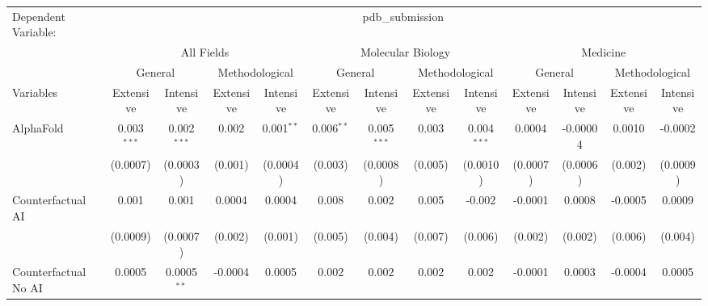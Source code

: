 \begingroup
\centering
\begin{tabular}{lcccccccccccc}
   \tabularnewline \midrule \midrule
   Dependent Variable: & \multicolumn{12}{c}{pdb\_submission}\\
 & \multicolumn{4}{c}{All Fields} & \multicolumn{4}{c}{Molecular Biology} & \multicolumn{4}{c}{Medicine} \\
\cmidrule(lr){2-5} \cmidrule(lr){6-9} \cmidrule(lr){10-13}
 & \multicolumn{2}{c}{General} & \multicolumn{2}{c}{Methodological} & \multicolumn{2}{c}{General} & \multicolumn{2}{c}{Methodological} & \multicolumn{2}{c}{General} & \multicolumn{2}{c}{Methodological} \\
\cmidrule(lr){2-3} \cmidrule(lr){4-5} \cmidrule(lr){6-7} \cmidrule(lr){8-9} \cmidrule(lr){10-11} \cmidrule(lr){12-13}
Variables & \multicolumn{1}{c}{Extensive} & \multicolumn{1}{c}{Intensive} & \multicolumn{1}{c}{Extensive} & \multicolumn{1}{c}{Intensive} & \multicolumn{1}{c}{Extensive} & \multicolumn{1}{c}{Intensive} & \multicolumn{1}{c}{Extensive} & \multicolumn{1}{c}{Intensive} & \multicolumn{1}{c}{Extensive} & \multicolumn{1}{c}{Intensive} & \multicolumn{1}{c}{Extensive} & \multicolumn{1}{c}{Intensive} \\
\cmidrule(lr){1-1}\cmidrule(lr){2-2} \cmidrule(lr){3-3} \cmidrule(lr){4-4} \cmidrule(lr){5-5} \cmidrule(lr){6-6} \cmidrule(lr){7-7} \cmidrule(lr){8-8} \cmidrule(lr){9-9} \cmidrule(lr){10-10} \cmidrule(lr){11-11} \cmidrule(lr){12-12} \cmidrule(lr){13-13}
   AlphaFold                                & 0.003$^{***}$ & 0.002$^{***}$  & 0.002    & 0.001$^{**}$ & 0.006$^{**}$ & 0.005$^{***}$ & 0.003   & 0.004$^{***}$ & 0.0004   & -0.00004  & 0.0010  & -0.0002\\   
                                            & (0.0007)      & (0.0003)       & (0.001)  & (0.0004)     & (0.003)      & (0.0008)      & (0.005) & (0.0010)      & (0.0007) & (0.0006)  & (0.002) & (0.0009)\\   
   Counterfactual AI                        & 0.001         & 0.001          & 0.0004   & 0.0004       & 0.008        & 0.002         & 0.005   & -0.002        & -0.0001  & 0.0008    & -0.0005 & 0.0009\\   
                                            & (0.0009)      & (0.0007)       & (0.002)  & (0.001)      & (0.005)      & (0.004)       & (0.007) & (0.006)       & (0.002)  & (0.002)   & (0.006) & (0.004)\\   
   Counterfactual No AI                     & 0.0005        & 0.0005$^{**}$  & -0.0004  & 0.0005       & 0.002        & 0.002         & 0.002   & 0.002         & -0.0001  & 0.0003    & -0.0004 & 0.0005\\   

\end{tabular}
